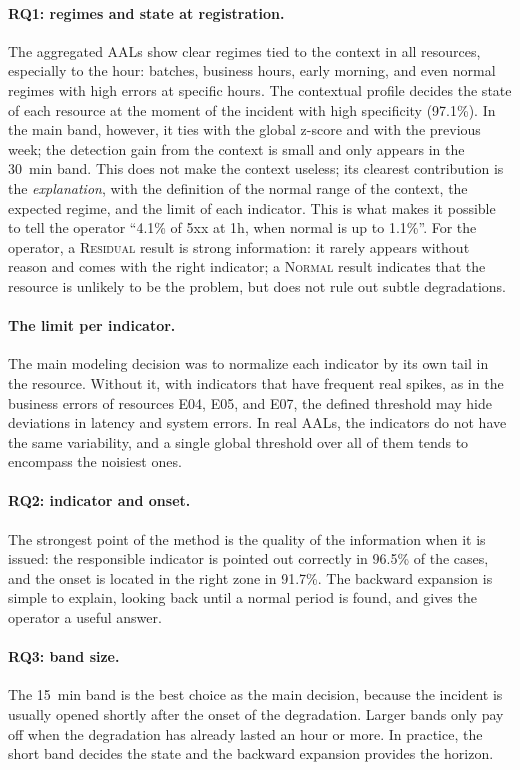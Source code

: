 \documentclass[sigconf,nonacm]{acmart}
\newcommand{\Normal}{\textsc{Normal}\xspace}
\newcommand{\Residual}{\textsc{Residual}\xspace}
\begin{document}
\paragraph{RQ1: regimes and state at registration.} The aggregated AALs show clear regimes tied to the context in all resources, especially to the hour: batches, business hours, early morning, and even normal regimes with high errors at specific hours. The contextual profile decides the state of each resource at the moment of the incident with high specificity (97.1\%). In the main band, however, it ties with the global z-score and with the previous week; the detection gain from the context is small and only appears in the 30~min band. This does not make the context useless; its clearest contribution is the \emph{explanation}, with the definition of the normal range of the context, the expected regime, and the limit of each indicator. This is what makes it possible to tell the operator ``4.1\% of 5xx at 1h, when normal is up to 1.1\%''. For the operator, a \Residual result is strong information: it rarely appears without reason and comes with the right indicator; a \Normal result indicates that the resource is unlikely to be the problem, but does not rule out subtle degradations.

\paragraph{The limit per indicator.} The main modeling decision was to normalize each indicator by its own tail in the resource. Without it, with indicators that have frequent real spikes, as in the business errors of resources E04, E05, and E07, the defined threshold may hide deviations in latency and system errors. In real AALs, the indicators do not have the same variability, and a single global threshold over all of them tends to encompass the noisiest ones.

\paragraph{RQ2: indicator and onset.} The strongest point of the method is the quality of the information when it is issued: the responsible indicator is pointed out correctly in 96.5\% of the cases, and the onset is located in the right zone in 91.7\%. The backward expansion is simple to explain, looking back until a normal period is found, and gives the operator a useful answer.

\paragraph{RQ3: band size.} The 15~min band is the best choice as the main decision, because the incident is usually opened shortly after the onset of the degradation. Larger bands only pay off when the degradation has already lasted an hour or more. In practice, the short band decides the state and the backward expansion provides the horizon.
\end{document}
